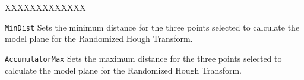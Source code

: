 \documentclass{InsightArticle}
\newcommand{\X}{XXXXXXXXXXXXX}
\begin{document}
\begin{liste}{\X}
\item[\texttt{MinDist}] Sets the minimum distance for the three points
selected to calculate the model plane for the Randomized Hough Transform.
\item[\texttt{AccumulatorMax}] Sets the maximum distance for the three points
selected to calculate the model plane for the Randomized Hough Transform.

\end{liste}



\end{document}
